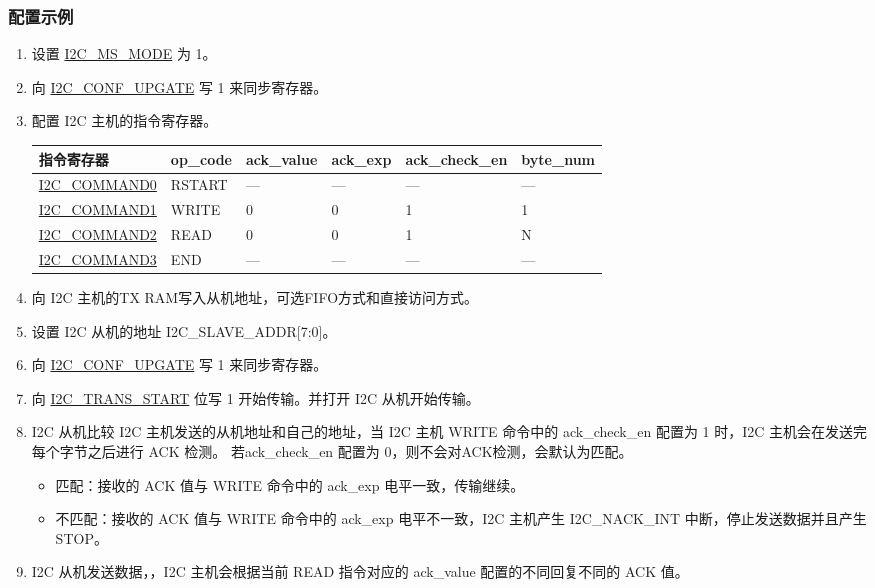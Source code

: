 \documentclass[main\_\_CN.tex]{subfiles}
\begin{document}
\subsubsection{配置示例}
\begin{enumerate}
\item 设置 \hyperref[fielddesc:I2CMSMODE]{I2C\_MS\_MODE} 为 1。
\item 向 \hyperref[fielddesc:I2CCONFUPGATE]{I2C\_CONF\_UPGATE} 写 1 来同步寄存器。
\item 配置 I2C 主机的指令寄存器。
\begin{longtable}{ | p{4cm} | p{2cm} | p{2cm} | p{2cm} |p{2cm} | p{2cm} |}
\hline\rowcolor{lightgray}
指令寄存器& op\_code & ack\_value&ack\_exp&ack\_check\_en&byte\_num  \\ \hline
\hyperref[fielddesc:I2CCOMMAND0]{I2C\_COMMAND0} & RSTART& ---&---&---&---  \\ \hline
\hyperref[fielddesc:I2CCOMMAND1]{I2C\_COMMAND1} & WRITE& 0&0&1&1  \\ \hline
\hyperref[fielddesc:I2CCOMMAND2]{I2C\_COMMAND2} & READ& 0&0&1&N  \\ \hline
\hyperref[fielddesc:I2CCOMMAND3]{I2C\_COMMAND3} & END& ---&---&---&---  \\ \hline
\end{longtable}
\item 向 I2C 主机的TX RAM写入从机地址，可选FIFO方式和直接访问方式。

\item 设置 I2C 从机的地址 I2C\_SLAVE\_ADDR[7:0]。

\item 向 \hyperref[fielddesc:I2CCONFUPGATE]{I2C\_CONF\_UPGATE} 写 1 来同步寄存器。
\item 向 \hyperref[fielddesc:I2CTRANSSTART]{I2C\_TRANS\_START} 位写 1 开始传输。并打开 I2C 从机开始传输。

\item I2C 从机比较 I2C 主机发送的从机地址和自己的地址，当 I2C 主机 WRITE 命令中的 ack\_check\_en 配置为 1 时，I2C 主机会在发送完每个字节之后进行 ACK 检测。 若ack\_check\_en 配置为 0，则不会对ACK检测，会默认为匹配。
\begin{itemize}
\item 匹配：接收的 ACK 值与 WRITE 命令中的 ack\_exp 电平一致，传输继续。
\item 不匹配：接收的 ACK 值与 WRITE 命令中的 ack\_exp 电平不一致，I2C 主机产生 I2C\_NACK\_INT 中断，停止发送数据并且产生 STOP。
\end{itemize}
\item I2C 从机发送数据，，I2C 主机会根据当前 READ 指令对应的 ack\_value 配置的不同回复不同的 ACK 值。


\end{enumerate}
\end{document}

